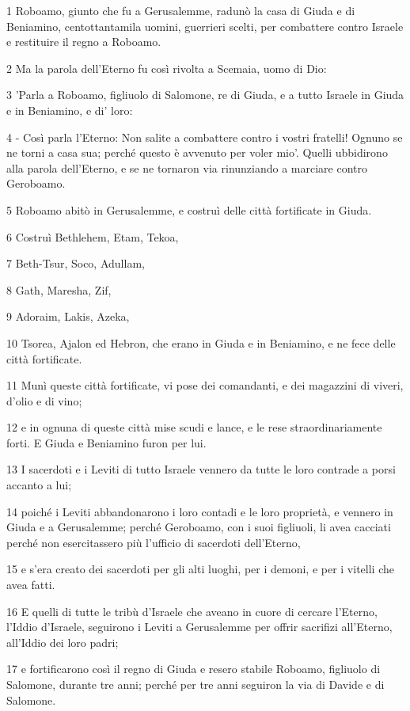 \par 1 Roboamo, giunto che fu a Gerusalemme, radunò la casa di Giuda e di Beniamino, centottantamila uomini, guerrieri scelti, per combattere contro Israele e restituire il regno a Roboamo.
\par 2 Ma la parola dell'Eterno fu così rivolta a Scemaia, uomo di Dio:
\par 3 'Parla a Roboamo, figliuolo di Salomone, re di Giuda, e a tutto Israele in Giuda e in Beniamino, e di' loro:
\par 4 - Così parla l'Eterno: Non salite a combattere contro i vostri fratelli! Ognuno se ne torni a casa sua; perché questo è avvenuto per voler mio'. Quelli ubbidirono alla parola dell'Eterno, e se ne tornaron via rinunziando a marciare contro Geroboamo.
\par 5 Roboamo abitò in Gerusalemme, e costruì delle città fortificate in Giuda.
\par 6 Costruì Bethlehem, Etam, Tekoa,
\par 7 Beth-Tsur, Soco, Adullam,
\par 8 Gath, Maresha, Zif,
\par 9 Adoraim, Lakis, Azeka,
\par 10 Tsorea, Ajalon ed Hebron, che erano in Giuda e in Beniamino, e ne fece delle città fortificate.
\par 11 Munì queste città fortificate, vi pose dei comandanti, e dei magazzini di viveri, d'olio e di vino;
\par 12 e in ognuna di queste città mise scudi e lance, e le rese straordinariamente forti. E Giuda e Beniamino furon per lui.
\par 13 I sacerdoti e i Leviti di tutto Israele vennero da tutte le loro contrade a porsi accanto a lui;
\par 14 poiché i Leviti abbandonarono i loro contadi e le loro proprietà, e vennero in Giuda e a Gerusalemme; perché Geroboamo, con i suoi figliuoli, li avea cacciati perché non esercitassero più l'ufficio di sacerdoti dell'Eterno,
\par 15 e s'era creato dei sacerdoti per gli alti luoghi, per i demoni, e per i vitelli che avea fatti.
\par 16 E quelli di tutte le tribù d'Israele che aveano in cuore di cercare l'Eterno, l'Iddio d'Israele, seguirono i Leviti a Gerusalemme per offrir sacrifizi all'Eterno, all'Iddio dei loro padri;
\par 17 e fortificarono così il regno di Giuda e resero stabile Roboamo, figliuolo di Salomone, durante tre anni; perché per tre anni seguiron la via di Davide e di Salomone.
